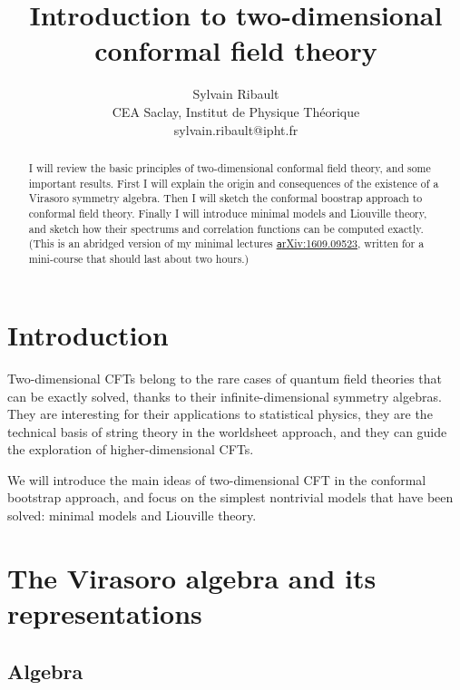 \documentclass[12pt, a4paper]{article}
\title{\bfseries Introduction to two-dimensional \\ conformal field theory}
\author{Sylvain Ribault \vspace{2mm}
\\
{\normalsize CEA Saclay, Institut de Physique Th\'eorique}
 \\
 {\footnotesize \ttfamily sylvain.ribault@ipht.fr }
}
\theoremstyle{break}
\begin{document}
\maketitle

\begin{abstract}
I will review the basic principles of two-dimensional conformal field theory, and some important results. First I will explain the origin and consequences of the existence of a Virasoro symmetry algebra. Then I will sketch the conformal boostrap approach to conformal field theory. Finally I will introduce minimal models and Liouville theory, and sketch how their spectrums and correlation functions can be computed exactly. (This is an abridged version of my minimal lectures \href{https://arxiv.org/abs/1609.09523}{\texttt arXiv:1609.09523}, written for a mini-course that should last about two hours.)
\end{abstract}


\tableofcontents

\hypersetup{linkcolor=blue}

\setcounter{section}{-1}

\section{Introduction}

Two-dimensional CFTs belong to the rare cases of quantum field theories that can be exactly solved, thanks to their infinite-dimensional symmetry algebras. They are interesting for their applications to statistical physics, they are the technical basis of string theory in the worldsheet approach, and they can guide the exploration of higher-dimensional CFTs. 

We will introduce the main ideas of two-dimensional CFT in the conformal bootstrap approach, and focus on the simplest nontrivial models that have been solved: minimal models and Liouville theory. 

\section{The Virasoro algebra and its representations}

\subsection{Algebra}
\end{document}
